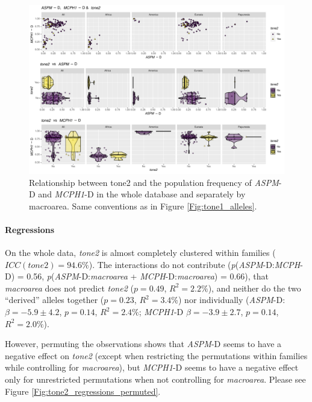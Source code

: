 \documentclass[twoside,onecolumn]{article}
\begin{document}
\begin{figure}[h]
  \centering
  \includegraphics[width=\textwidth]{../../code/figures/tone2_alleles}
  \caption{Relationship between tone2 and the population frequency of \textit{ASPM}-D and \textit{MCPH1}-D in the whole database and separately by macroarea. Same conventions as in Figure \ref{Fig:tone1_alleles}.}
  \label{Fig:tone2_alleles}
\end{figure}


\paragraph{Regressions}

On the whole data, \textit{tone2} is almost completely clustered within families ($ICC(tone2) =94.6\%$).
The interactions do not contribute (\textit{p}(\textit{ASPM}-D:\textit{MCPH}-D) = 0.56, \textit{p}(\textit{ASPM}-D:\textit{macroarea} + \textit{MCPH}-D:\textit{macroarea}) = 0.66), that \textit{macroarea} does not predict \textit{tone2} ($p = 0.49$, $R^2 = 2.2\%$), and neither do the two ``derived'' alleles together ($p = 0.23$, $R^2 = 3.4\%$) nor individually (\textit{ASPM}-D: $\beta = -5.9 \pm 4.2$, $p = 0.14$, $R^2 = 2.4\%$; \textit{MCPH1}-D $\beta = -3.9 \pm 2.7$, $p = 0.14$, $R^2 = 2.0\%$).

However, permuting the observations shows that \textit{ASPM}-D seems to have a negative effect on \textit{tone2} (except when restricting the permutations within families while controlling for \textit{macroarea}), but \textit{MCPH1}-D seems to have a negative effect only for unrestricted permutations when not controlling for \textit{macroarea}.
Please see Figure \ref{Fig:tone2_regressions_permuted}.
\end{document}

